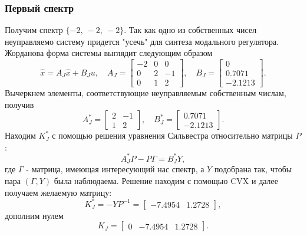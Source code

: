\subsubsection{Первый спектр}

Получим спектр $\{-2,\ -2,\ -2\}$. Так как одно из собственных чисел неуправляемо систему
придется "усечь" для синтеза модального регулятора.
Жорданова форма системы выглядит следующим образом
\begin{equation*}
    \dot{\hat x} = A_J\hat x+B_Ju,\quad A_J=\begin{bmatrix}
        -2&     0 &    0\\
        0  &   2 &   -1\\
        0   &  1&     2
    \end{bmatrix},\quad
    B_J=\begin{bmatrix}
        0\\
        0.7071\\
       -2.1213
    \end{bmatrix}.
\end{equation*}
Вычеркнем элементы, соответствующие неуправляемым 
собственным числам, получив
\begin{equation*}
    A_J^*=\begin{bmatrix}
        2 & -1 \\ 1 & 2
    \end{bmatrix},\quad
    B_J^*=\begin{bmatrix}
        0.7071\\
       -2.1213
    \end{bmatrix}.
\end{equation*}
Находим $K_J^*$ с помощью решения уравнения Сильвестра относительно матрицы $P$:
\begin{equation*}
    A_J^*P-P\Gamma = B_J^*Y,
\end{equation*}
где $\Gamma$ - матрица, имеющая интересующий нас спектр, а $Y$ подобрана так, чтобы
пара $(\Gamma, Y)$ была наблюдаема. Решение находим с помощью CVX и далее получаем
желаемую матрицу:
\begin{equation*}
    K_J^*=-YP^{-1}=\begin{bmatrix}
        -7.4954&     1.2728
    \end{bmatrix},
\end{equation*}
дополним нулем
\begin{equation*}
    K_J=\begin{bmatrix}
        0 & -7.4954&     1.2728
    \end{bmatrix}.
\end{equation*}

